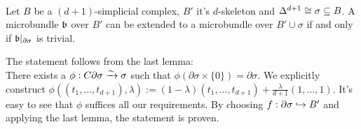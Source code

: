  \\
Let $B$ be a $(d + 1)$-simplicial complex, $B'$ it's $d$-skeleton and $\Delta^{d + 1} \cong \sigma \subseteq{} B$.
A microbundle $\mathfrak{b}$ over $B'$ can be extended to a microbundle over $B' \cup \sigma$ if and only if $\mathfrak{b} \vert_{\partial \sigma}$ is trivial.
\begin{myproof}
The statement follows from the last lemma: \\
There exists a $\phi: C\partial \sigma \xrightarrow{\sim} \sigma$ such that $\phi(\partial \sigma \times \{0\}) = \partial \sigma$.
We explicitly construct $\phi((t_1, \dots, t_{d + 1}), \lambda) := (1 - \lambda) (t_1, \dots, t_{d + 1}) + \frac{\lambda}{d + 1} (1, \dots, 1)$.
It's easy to see that $\phi$ suffices all our requirements.
By choosing $f: \partial \sigma \hookrightarrow{} B'$ and applying the last lemma, the statement is proven.
\end{myproof}